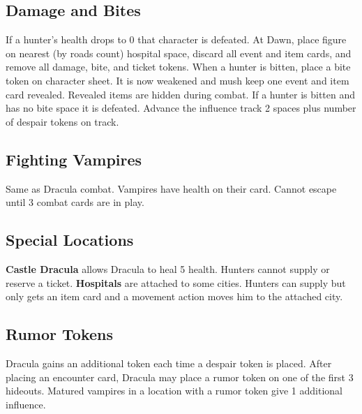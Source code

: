 \documentclass[12pt]{article}
\begin{document}
\begin{multicols*}{2}
\subsection*{Damage and Bites}
If a hunter's health drops to 0 that character is defeated. At Dawn, place figure on nearest (by roads count) hospital space, discard all event and item cards, and remove all damage, bite, and ticket tokens. When a hunter is bitten, place a bite token on character sheet. It is now weakened and mush keep one event and item card revealed. Revealed items are hidden during combat. If a hunter is bitten and has no bite space it is defeated. Advance the influence track 2 spaces plus number of despair tokens on track.

\subsection*{Fighting Vampires}
Same as Dracula combat. Vampires have health on their card. Cannot escape until 3 combat cards are in play.

\subsection*{Special Locations}
\textbf{Castle Dracula} allows Dracula to heal 5 health. Hunters cannot supply or reserve a ticket. \textbf{Hospitals} are attached to some cities. Hunters can supply but only gets an item card and a movement action moves him to the attached city.

\subsection*{Rumor Tokens}
Dracula gains an additional token each time a despair token is placed. After placing an encounter card, Dracula may place a rumor token on one of the first 3 hideouts. Matured vampires in a location with a rumor token give 1 additional influence.


\end{multicols*}
\end{document}
